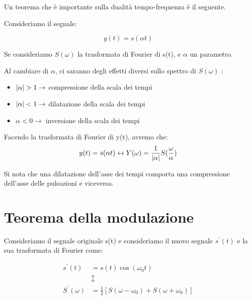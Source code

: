 Un teorema che è importante sulla dualità tempo-frequenza è il seguente. \newline 


Consideriamo il segnale: 

{
    \Large 
    \begin{equation}
        y(t) = s(\alpha t)
    \end{equation}
}

Se consideriamo $S(\omega)$ la trasformata di Fourier di s(t), e $\alpha$ un parametro. \newline 

Al cambiare di $\alpha$, ci saranno degli effetti diversi sullo spettro di $S(\omega)$ : 

\begin{itemize}
    \item $\abs{\alpha} > 1 \rightarrow $ compressione della scala dei tempi 
    \item  $\abs{\alpha} < 1 \rightarrow $ dilatazione della scala dei tempi 
    \item $\alpha < 0 \rightarrow $ inversione della scala dei tempi 
\end{itemize}

Facendo la trasformata di Fourier di y(t), avremo che: 
{
    \Large 
    \begin{equation}
        y(t) = s(\alpha t) 
        \leftrightarrow 
        Y(\omega) = \frac{1}{\abs{\alpha}} S(\frac{\omega}{\alpha})
    \end{equation}
} 

Si nota che una dilatazione dell'asse dei tempi comporta una compressione dell'asse delle pulsazioni e viceversa. \newline 

\newpage 

\section{Teorema della modulazione} 

Consideriamo il segnale originale s(t) e consideriamo il nuovo segnale $s^{'} (t)$ e la sua trasformata di Fourier come: 

{
    \Large 
    \begin{equation}
        \begin{split}
            s^{'} (t) &= s(t)\cos(\omega_0 t) \\ 
            &\updownarrow \\
            S^{'} (\omega) &= \frac{1}{2} [S(\omega - \omega_0) + S(\omega + \omega_0)]    
        \end{split}
    \end{equation}
}

